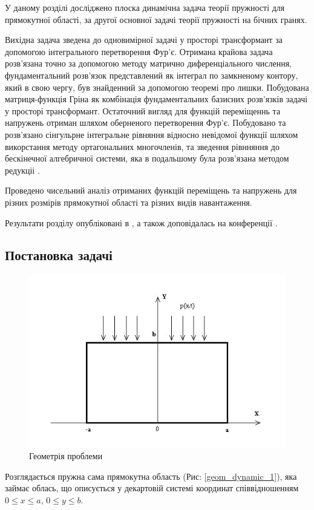 У даному розділі досліджено плоска динамічна задача теорії пружності для прямокутної області,
за другої основної задачі теорії пружності на бічних гранях.

Вихідна задача зведена до одновимірної задачі у просторі трансформант за допомогою інтегрального перетворення Фур'є.
Отримана крайова задача розв'язана точно за допомогою методу матрично диференціального числення,
фундаментальний розв'язок представлений як інтеграл по замкненому контору, який в свою чергу, був знайденний за допомогою теоремі про лишки.
Побудована матриця-функція Гріна як комбінація фундаментальних базисних розв'язків задачі у просторі трансформант.
Остаточний вигляд для функцій переміщеннь та напружень отриман шляхом оберненого перетворення Фур'є.
Побудовано та розв'язано сінгульрне інтегральне рівняння відносно невідомої функції шляхом викорстання методу ортагональних многочленів, та зведення рівнняння до бескінечної алгебричної системи,
яка в подальшому була розв'язана методом редукціі \cite{popov_3}.

Проведено чисельний аналіз отриманих функцій переміщень та напружень для різних розмірів прямокутної області та різних видів навантаження.

Результати розділу опубліковані в \cite{pozhylenkov_6}, а також доповідалась на конференції \cite{conf_5}.

\subsection{Постановка задачі}
\begin{figure}[h]
    \begin{center}
        \includegraphics[scale=1]{images/geometry/image_2.jpg}
    \end{center}
    \caption{Геометрія проблеми}\label{geom_dynamic_2}
\end{figure}
Розглядається пружна сама прямокутна область (Рис: \ref{geom_dynamic_1}), яка займає облась,
що описується у декартовій системі координат співвідношенням $0 \le x \le a$, $0 \le y \le b$.

